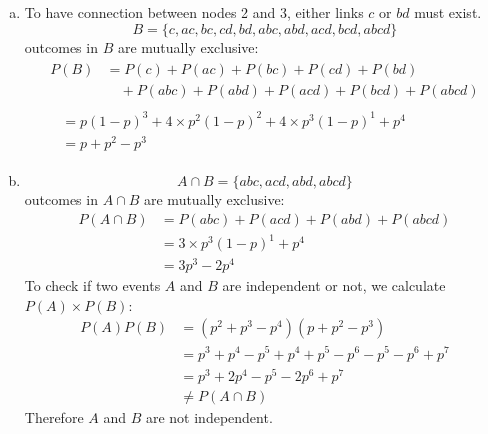 \documentclass[12pt, letterpaper]{scrartcl}
\begin{document}
\begin{enumerate}[a.]
    \item To have connection between nodes 2 and 3, either links $c$ or $bd$ must exist.
    \begin{equation*}
        B = \{c, ac, bc, cd, bd, abc, abd, acd, bcd, abcd\}
    \end{equation*}
    outcomes in $B$ are mutually exclusive:
    \begin{align*}
    \begin{split}
       P(B) &= P(c)+P(ac)+P(bc)+P(cd)+P(bd)\\
       &\quad +P(abc)+P(abd)+P(acd)+P(bcd)+P(abcd)
    \end{split}\\
    \begin{split}
        &= p(1-p)^3+4\times p^2(1-p)^2+4\times p^3(1-p)^1+p^4\\
        &= p+p^2-p^3 
    \end{split}
    \end{align*}
    \item 
    \begin{equation*}
        A\cap B=\{abc, acd, abd, abcd\}
    \end{equation*}
    outcomes in $A\cap B$ are mutually exclusive:
    \begin{align*}
        P(A\cap B) &= P(abc)+P(acd)+P(abd)+P(abcd)\\
        &= 3\times p^3(1-p)^1+p^4\\
        &= 3p^3-2p^4
    \end{align*}
    To check if two events $A$ and $B$ are independent or not, we calculate $P(A)\times P(B)$:
    \begin{align*}
        P(A)P(B) &= (p^2+p^3-p^4)(p+p^2-p^3)\\
        &= p^3+p^4-p^5+p^4+p^5-p^6-p^5-p^6+p^7\\
        &= p^3+2p^4-p^5-2p^6+p^7\\
        &\neq P(A\cap B)
    \end{align*}
    Therefore $A$ and $B$ are not independent.
    

\end{enumerate}
\end{document}
